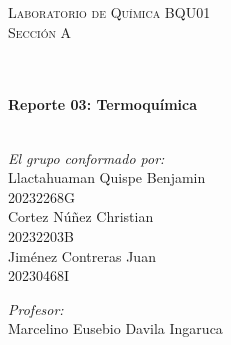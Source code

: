 \documentclass[10pt]{article}
\begin{document}
\begin{center}
\begin{minipage}{0.9\textwidth} 
\begin{center}																					%
\textsc{\LARGE  Laboratorio de Química BQU01\\[0.3cm] Sección A }
\end{center}
\end{minipage}\\[0.3cm]
 			\vspace*{0.4cm}																		%
\HRule \\[0.5cm]																	%
{ \huge \bfseries Reporte 03: Termoquímica}\\[0.3cm]	%
\HRule \\[0.9cm]																	%
\begin{minipage}{0.46\textwidth}													%
\begin{flushleft} \large															%

\emph{El grupo conformado por:}\\	
Llactahuaman Quispe Benjamin\\
20232268G \\
\vspace{2mm}
 Cortez Núñez Christian\\
 20232203B\\
\vspace{2mm}
 Jiménez Contreras Juan\\
 20230468I\\
 

\end{flushleft}																		%
\end{minipage}		
\begin{minipage}{0.52\textwidth}		
\vspace{-3cm}											%
\begin{flushright} \large															%
\emph{Profesor:} \\																	%
 Marcelino Eusebio Davila Ingaruca\\
\end{flushright}																	%
\end{minipage}	
\vspace*{1cm}
 	

\end{center}
\end{document}
